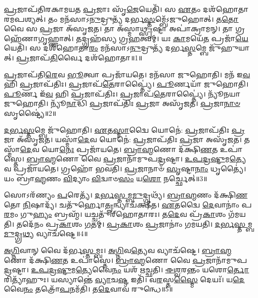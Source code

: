 \setcounter{anuvakam}{0}

\-\ul{𑌪𑍍𑌰}\-𑌜𑌾𑌪᳴𑌤𑌿𑌰𑌕𑌾𑌮𑌯𑌤 \ul{𑌪𑍍𑌰}\-𑌜𑌾𑌃 𑌸𑍃᳴\-\ul{𑌜𑍇}\-𑌯𑍇𑌤𑌿᳴।
𑌸 \ul{𑌏}\-𑌤𑌂 𑌦𑌶᳴𑌹𑍋𑌤𑌾𑌰𑌮\-𑌪𑌶𑍍𑌯𑌤𑍍।
𑌤𑌂 𑌮𑌨᳴𑌸𑌾\-𑌽\-\ul{𑌨𑍁}\-𑌦𑍍𑌰𑍁𑌤𑍍𑌯᳴ 𑌦𑌰𑍍𑌭\-\ul{𑌸𑍍𑌤}\-𑌮𑍍𑌬𑍇᳴\-𑌽𑌜𑍁𑌹𑍋𑌤𑍍।
𑌤\-\ul{𑌤𑍋} 𑌵𑍈 𑌸 \ul{𑌪𑍍𑌰}\-𑌜𑌾 𑌅᳴\-𑌸𑍃𑌜𑌤।
𑌤𑌾 𑌅᳴𑌸𑍍𑌮𑌾\-\ul{𑌥𑍍𑌸𑍃}\-𑌷𑍍𑌟𑌾 𑌅𑌪𑌾॑𑌕𑍍𑌰𑌾𑌮𑌨𑍍।
𑌤𑌾 𑌗𑍍𑌰𑌹𑍇᳴𑌣𑌾𑌗𑍃𑌹𑍍𑌣𑌾𑌤𑍍।
𑌤𑌦𑍍𑌗𑍍𑌰𑌹᳴𑌸𑍍𑌯 𑌗𑍍𑌰\-\ul{𑌹}\-𑌤𑍍𑌵𑌮𑍍।
𑌯𑌃 \ul{𑌕𑌾}\-𑌮𑌯𑍇᳴\-\ul{𑌤} 𑌪𑍍𑌰𑌜𑌾᳴\-\ul{𑌯𑍇}\-𑌯𑍇𑌤𑌿᳴।
𑌸 𑌦𑌶᳴𑌹𑍋𑌤𑌾\-\ul{𑌰𑌂} 𑌮𑌨᳴𑌸𑌾\-𑌽\-\ul{𑌨𑍁}\-𑌦𑍍𑌰𑍁𑌤𑍍𑌯᳴ 𑌦𑌰𑍍𑌭\-\ul{𑌸𑍍𑌤}\-𑌮𑍍𑌬𑍇 𑌜𑍁᳴𑌹𑍁𑌯𑌾𑌤𑍍।
\-\ul{𑌪𑍍𑌰}\-𑌜𑌾𑌪᳴\-\ul{𑌤𑌿}\-𑌰𑍍𑌵𑍈 𑌦𑌶᳴𑌹𑍋𑌤𑌾॥1॥

\-\ul{𑌪𑍍𑌰}\-𑌜𑌾𑌪᳴𑌤𑌿\-\ul{𑌰𑍇}\-𑌵 \ul{𑌭𑍂}\-𑌤𑍍𑌵𑌾 𑌪𑍍𑌰𑌜𑌾᳴𑌯𑌤𑍇।
𑌮𑌨᳴𑌸𑌾 𑌜𑍁𑌹𑍋𑌤𑌿।
𑌮𑌨᳴ 𑌇\-\ul{𑌵} 𑌹𑌿 \ul{𑌪𑍍𑌰}\-𑌜𑌾\-𑌪᳴𑌤𑌿𑌃।
\-\ul{𑌪𑍍𑌰}\-𑌜𑌾𑌪᳴\-\ul{𑌤𑍇}\-𑌰𑌾𑌪𑍍𑌤𑍍𑌯𑍈॑।
\-\ul{𑌪𑍂}\-𑌰𑍍𑌣𑌯𑌾᳴ 𑌜𑍁𑌹𑍋𑌤𑌿।
\-\ul{𑌪𑍂}\-𑌰𑍍𑌣 𑌇᳴\-\ul{𑌵} 𑌹𑌿 \ul{𑌪𑍍𑌰}\-𑌜𑌾\-𑌪᳴𑌤𑌿𑌃।
\-\ul{𑌪𑍍𑌰}\-𑌜𑌾𑌪᳴\-\ul{𑌤𑍇}\-𑌰𑌾𑌪𑍍𑌤𑍍𑌯𑍈॑।
𑌨𑍍𑌯𑍂᳴𑌨𑌯𑌾 𑌜𑍁𑌹𑍋𑌤𑌿।
𑌨𑍍𑌯𑍂᳴\-\ul{𑌨𑌾}\-𑌦𑍍𑌧𑌿 \ul{𑌪𑍍𑌰}\-𑌜𑌾\-𑌪᳴𑌤𑌿𑌃 \ul{𑌪𑍍𑌰}\-𑌜𑌾 𑌅𑌸𑍃᳴𑌜𑌤।
\-\ul{𑌪𑍍𑌰}\-𑌜𑌾\-\ul{𑌨𑌾}\-\-\ul{𑍞} 𑌸𑍃𑌷𑍍𑌟𑍍𑌯𑍈॑॥2॥

\-\ul{𑌦}\-\-\ul{𑌰𑍍𑌭}\-\-\ul{𑌸𑍍𑌤}\-𑌮𑍍𑌬𑍇 𑌜𑍁᳴𑌹𑍋𑌤𑌿।
\-\ul{𑌏}\-𑌤\-\ul{𑌸𑍍𑌮𑌾}\-𑌦𑍍𑌵𑍈 𑌯𑍋𑌨𑍇॑: \ul{𑌪𑍍𑌰}\-𑌜𑌾\-𑌪᳴𑌤𑌿𑌃 \ul{𑌪𑍍𑌰}\-𑌜𑌾 𑌅᳴\-𑌸𑍃𑌜𑌤।
𑌯𑌸𑍍𑌮𑌾᳴\-\ul{𑌦𑍇}\-𑌵 𑌯𑍋𑌨𑍇॑: \ul{𑌪𑍍𑌰}\-𑌜𑌾\-𑌪᳴𑌤𑌿𑌃 \ul{𑌪𑍍𑌰}\-𑌜𑌾 𑌅𑌸𑍃᳴𑌜𑌤।
𑌤𑌸𑍍𑌮𑌾᳴\-\ul{𑌦𑍇}\-𑌵 𑌯𑍋\-\ul{𑌨𑍇𑌃} 𑌪𑍍𑌰𑌜𑌾᳴𑌯𑌤𑍇।
\-\ul{𑌬𑍍𑌰𑌾}\-\-\ul{𑌹𑍍𑌮}\-𑌣𑍋 𑌦᳴𑌕𑍍𑌷𑌿\-\ul{𑌣}\-𑌤 𑌉𑌪𑌾॑𑌸𑍍𑌤𑍇।
\-\ul{𑌬𑍍𑌰𑌾}\-\-\ul{𑌹𑍍𑌮}\-𑌣𑍋 𑌵𑍈 \ul{𑌪𑍍𑌰}\-𑌜𑌾𑌨𑌾᳴𑌮𑍁𑌪\-\ul{𑌦𑍍𑌰}\-𑌷𑍍𑌟𑌾।
\-\ul{𑌉}\-\-\ul{𑌪}\-\-\ul{𑌦𑍍𑌰}\-\-\ul{𑌷𑍍𑌟𑍁}\-𑌮\-\ul{𑌤𑍍𑌯𑍇}\-𑌵 𑌪𑍍𑌰𑌜𑌾᳴𑌯𑌤𑍇।
𑌗𑍍𑌰𑌹𑍋᳴ 𑌭𑌵𑌤𑌿।
\-\ul{𑌪𑍍𑌰}\-𑌜𑌾𑌨𑌾𑍞᳴ \ul{𑌸𑍃}\-𑌷𑍍𑌟𑌾\-\ul{𑌨𑌾𑌂} 𑌧𑍃𑌤𑍍𑌯𑍈॑।
𑌯𑌂 𑌬𑍍𑌰𑌾॑\-\ul{𑌹𑍍𑌮}\-𑌣𑌂 \ul{𑌵𑌿}\-𑌦𑍍𑌯𑌾𑌂 \ul{𑌵𑌿}\-𑌦𑍍𑌵𑌾𑍞\-\ul{𑌸𑌂} 𑌯\-\ul{𑌶𑍋} 𑌨𑌰𑍍𑌚𑍍𑌛𑍇𑌤𑍍॥3॥

𑌸𑍋𑌽𑌰᳴𑌣𑍍𑌯𑌂 \ul{𑌪}\-𑌰𑍇𑌤𑍍𑌯᳴।
\-\ul{𑌦}\-\-\ul{𑌰𑍍𑌭}\-\-\ul{𑌸𑍍𑌤}\-𑌮𑍍𑌬\-\ul{𑌮𑍁}\-𑌦𑍍𑌗𑍍𑌰𑌥𑍍𑌯᳴।
\-\ul{𑌬𑍍𑌰𑌾}\-\-\ul{𑌹𑍍𑌮}\-𑌣𑌂 𑌦᳴𑌕𑍍𑌷𑌿\-\ul{𑌣}\-𑌤𑍋 \ul{𑌨𑌿}\-𑌷𑌾𑌦𑍍𑌯᳴।
𑌚𑌤𑍁᳴𑌰𑍍\mbox{}𑌹𑍋\-\ul{𑌤𑍄}\-𑌨𑍍𑌵𑍍𑌯𑌾𑌚᳴𑌕𑍍𑌷𑍀𑌤।
\-\ul{𑌏}\-𑌤𑌦𑍍𑌵𑍈 \ul{𑌦𑍇}\-𑌵𑌾𑌨𑌾𑌂॑ 𑌪\-\ul{𑌰}\-𑌮𑌂 𑌗𑍁\-\ul{𑌹𑍍𑌯𑌂} 𑌬𑍍𑌰𑌹𑍍𑌮᳴।
𑌯𑌚𑍍𑌚𑌤𑍁᳴𑌰𑍍‌\mbox{}𑌹𑍋𑌤𑌾𑌰𑌃।
𑌤\-\ul{𑌦𑍇}\-𑌵 𑌪𑍍𑌰᳴\-\ul{𑌕𑌾}\-𑌶𑌂 𑌗᳴𑌮𑌯𑌤𑌿।
𑌤𑌦𑍇᳴𑌨𑌂 𑌪𑍍𑌰\-\ul{𑌕𑌾}\-𑌶𑌂 \ul{𑌗}\-𑌤𑌮𑍍।
\-\ul{𑌪𑍍𑌰}\-\-\ul{𑌕𑌾}\-𑌶𑌂 \ul{𑌪𑍍𑌰}\-𑌜𑌾𑌨𑌾𑌂॑ 𑌗𑌮𑌯𑌤𑌿।
\-\ul{𑌦}\-\-\ul{𑌰𑍍𑌭}\-\-\ul{𑌸𑍍𑌤}\-𑌮𑍍𑌬\-\ul{𑌮𑍁}\-𑌦𑍍𑌗𑍍𑌰\-\ul{𑌥𑍍𑌯} 𑌵𑍍𑌯𑌾𑌚᳴𑌷𑍍𑌟𑍇॥4॥

\-\ul{𑌅}\-\-\ul{𑌗𑍍𑌨𑌿}\-𑌵𑌾𑌨𑍍 𑌵𑍈 𑌦᳴𑌰𑍍𑌭\-\ul{𑌸𑍍𑌤}\-𑌮𑍍𑌬𑌃।
\-\ul{𑌅}\-\-\ul{𑌗𑍍𑌨𑌿}\-𑌵\-\ul{𑌤𑍍𑌯𑍇}\-𑌵 𑌵𑍍𑌯𑌾𑌚᳴𑌷𑍍𑌟𑍇।
\-\ul{𑌬𑍍𑌰𑌾}\-\-\ul{𑌹𑍍𑌮}\-𑌣𑍋 𑌦᳴𑌕𑍍𑌷𑌿\-\ul{𑌣}\-𑌤 𑌉𑌪𑌾॑𑌸𑍍𑌤𑍇।
\-\ul{𑌬𑍍𑌰𑌾}\-\-\ul{𑌹𑍍𑌮}\-𑌣𑍋 𑌵𑍈 \ul{𑌪𑍍𑌰}\-𑌜𑌾𑌨𑌾᳴𑌮𑍁𑌪\-\ul{𑌦𑍍𑌰}\-𑌷𑍍𑌟𑌾।
\-\ul{𑌉}\-\-\ul{𑌪}\-\-\ul{𑌦𑍍𑌰}\-\-\ul{𑌷𑍍𑌟𑍁}\-𑌮\-\ul{𑌤𑍍𑌯𑍇}\-𑌵𑍈\-\ul{𑌨𑌂} 𑌯𑌶᳴ 𑌋𑌚𑍍𑌛𑌤𑌿।
\-\ul{𑌈}\-\-\ul{𑌶𑍍𑌵}\-𑌰𑌨𑍍𑌤𑌂 𑌯𑌶𑍋\-\ul{𑌰𑍍𑌤𑍋}\-𑌰𑌿𑌤𑍍𑌯𑌾᳴𑌹𑍁𑌃।
𑌯𑌸𑍍𑌯𑌾𑌨𑍍𑌤𑍇॑ \ul{𑌵𑍍𑌯𑌾}\-𑌚\-\ul{𑌷𑍍𑌟} 𑌇𑌤𑌿᳴।
𑌵\-\ul{𑌰}\-𑌸𑍍𑌤\-\ul{𑌸𑍍𑌮𑍈} 𑌦𑍇𑌯𑌃᳴।
𑌯\-\ul{𑌦𑍇}\-𑌵𑍈\-\ul{𑌨𑌂} 𑌤𑌤𑍍𑌰𑍋᳴\-\ul{𑌪}\-𑌨𑌮᳴𑌤𑌿।
𑌤\-\ul{𑌦𑍇}\-𑌵𑌾𑌵᳴ 𑌰𑍁𑌨𑍍𑌧𑍇॥5॥

